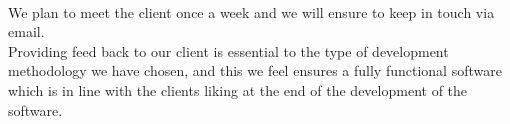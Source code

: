 \newline \\
We plan to meet the client once a week and we will ensure to keep in touch
via email.
\newline \\
Providing feed back to our client is essential to the type of development methodology we have chosen,
and this we feel ensures a fully functional software which is in line with the clients liking at the
end of the development of the software.

